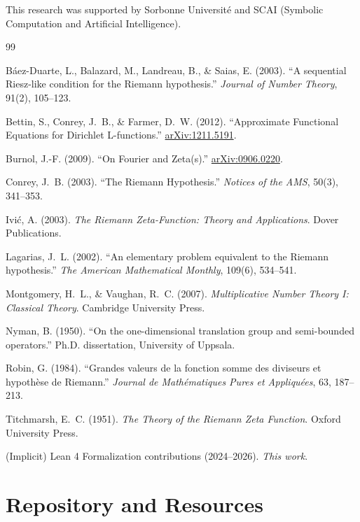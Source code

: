 \documentclass[11pt,a4paper]{article}
\newcommand{\arxiv}[1]{\href{https://arxiv.org/abs/#1}{arXiv:#1}}
\begin{document}
This research was supported by Sorbonne Université and SCAI (Symbolic Computation and Artificial Intelligence).

\begin{thebibliography}{99}

Báez-Duarte, L., Balazard, M., Landreau, B., \& Saias, E. (2003).
``A sequential Riesz-like condition for the Riemann hypothesis.''
\textit{Journal of Number Theory}, 91(2), 105--123.

Bettin, S., Conrey, J.~B., \& Farmer, D.~W. (2012).
``Approximate Functional Equations for Dirichlet L-functions.''
\arxiv{1211.5191}.

Burnol, J.-F. (2009).
``On Fourier and Zeta(s).''
\arxiv{0906.0220}.

Conrey, J.~B. (2003).
``The Riemann Hypothesis.''
\textit{Notices of the AMS}, 50(3), 341--353.

Ivić, A. (2003).
\textit{The Riemann Zeta-Function: Theory and Applications}.
Dover Publications.

Lagarias, J.~L. (2002).
``An elementary problem equivalent to the Riemann hypothesis.''
\textit{The American Mathematical Monthly}, 109(6), 534--541.

Montgomery, H.~L., \& Vaughan, R.~C. (2007).
\textit{Multiplicative Number Theory I: Classical Theory}.
Cambridge University Press.

Nyman, B. (1950).
``On the one-dimensional translation group and semi-bounded operators.''
Ph.D. dissertation, University of Uppsala.

Robin, G. (1984).
``Grandes valeurs de la fonction somme des diviseurs et hypothèse de Riemann.''
\textit{Journal de Mathématiques Pures et Appliquées}, 63, 187--213.

Titchmarsh, E.~C. (1951).
\textit{The Theory of the Riemann Zeta Function}.
Oxford University Press.

(Implicit) Lean 4 Formalization contributions (2024--2026).
\textit{This work}.

\end{thebibliography}

\appendix

\section{Repository and Resources}
\label{app:resources}
\end{document}
